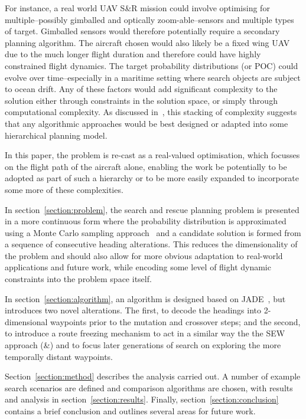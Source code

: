 \documentclass[10pt,a4paper, oneside, conference]{IEEEtran}
\begin{document}
	For instance, a real world UAV S\&R mission could involve optimising for multiple--possibly gimballed and optically zoom-able--sensors and multiple types of target. Gimballed sensors would therefore potentially require a secondary planning algorithm. The aircraft chosen would also likely be a fixed wing UAV due to the much longer flight duration and therefore could have highly constrained flight dynamics. The target probability distributions (or POC) could evolve over time--especially in a maritime setting where search objects are subject to ocean drift.
	Any of these factors would add significant complexity to the solution either through constraints in the solution space, or simply through computational complexity.
	As discussed in~\cite{Clark2013}, this stacking of complexity suggests that any algorithmic approaches would be best designed or adapted into some hierarchical planning model.
	
	In this paper, the problem is re-cast as a real-valued optimisation, which focusses on the flight path of the aircraft alone, enabling the work be potentially to be adopted as part of such a hierarchy or to be more easily expanded to incorporate some more of these complexities.
	
	
	In section~\ref{section:problem}, the search and rescue planning problem is presented in a more continuous form where the probability distribution is approximated using a Monte Carlo sampling approach~\cite{hastings1970monte} and a candidate solution is formed from a sequence of consecutive heading alterations. This reduces the dimensionality of the problem and should also allow for more obvious adaptation to real-world applications and future work, while encoding some level of flight dynamic constraints into the problem space itself.
	
	In section~\ref{section:algorithm}, an algorithm is designed based on JADE~\cite{Zhang2009}, but introduces two novel alterations. The first, to decode the headings into 2-dimensional waypoints prior to the mutation and crossover steps; and the second, to introduce a route freezing mechanism to act in a similar way the the SEW approach (\cite{Yang2015}\&\cite{Yang2016}) and to focus later generations of search on exploring the more temporally distant waypoints.
	
	Section~\ref{section:method} describes the analysis carried out. A number of example search scenarios are defined and comparison algorithms are chosen, with results and analysis in section~\ref{section:results}.
	Finally, section~\ref{section:conclusion} contains a brief conclusion and outlines several areas for future work.
	
\end{document}
